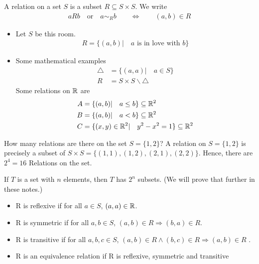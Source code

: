 \begin{df}
A relation on a set $S$ is a subset $R \subseteq S \times S$. We write
\begin{align*}
aRb \quad \text{or} \quad a \sim_R b \qquad \Leftrightarrow \qquad (a,b) \in R
\end{align*}
\end{df}

\begin{ex}
\begin{itemize}
\item
Let $S$ be this room.
\begin{align*}
R = \{ ( a,b) | \quad a\text{ is in love with }b \}
\end{align*}
\item
Some mathematical examples
\begin{align*}
\triangle & = \{ (a,a) | \quad a \in S \} \\
R & = S \times S \backslash \triangle 
\end{align*}
Some relations on $\mathbb R$ are 
\begin{align*}
A &= \{(a,b)| \quad a \leq b \} \subseteq \mathbb R^2 \\
B &= \{(a,b)| \quad a < b \} \subseteq \mathbb R^2\\
C & = \{(x,y) \in \mathbb R^2| \quad y^2-x^2 = 1 \} \subseteq \mathbb R^2 
\end{align*}
\end{itemize}
\end{ex}

\begin{ex}
How many relations are there on the set $S = \{1,2\}$?
A relation on $S = \{1,2\}$ is precisely a subset of $ S \times S = \{(1,1), (1,2), (2,1), (2,2) \}$. Hence, there are $2^4 =16$ Relations on the set.
\end{ex}


\begin{rk}
If $T$ is a set with $n$ elements, then $T$ has $2^n$ subsets. (We will prove that further in these notes.)
\end{rk}


\begin{pr}
\begin{itemize}
\item
R is reflexive if for all $a \in S$, \quad $(a,a) \in \mathbb R$.
\item
R is symmetric if for all $a,b \in S$, \quad $(a,b) \in R \Rightarrow (b,a) \in R$.
\item
R is transitive if for all $a,b,c \in S$, \quad $(a,b) \in R \wedge (b,c) \in R \Rightarrow (a,b) \in R$ .
\item
R is an equivalence relation if R is reflexive, symmetric and transitive 
\end{itemize}
\end{pr}

